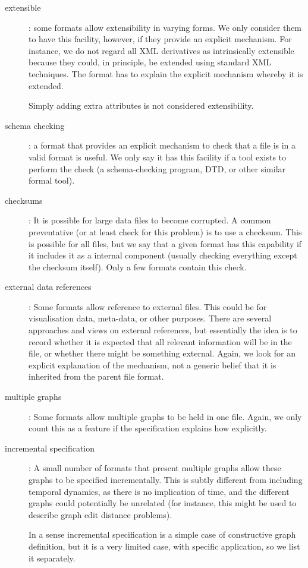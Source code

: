 \documentclass{sig-alternate}
\begin{document}
\begin{description}
\item[extensible]: some formats allow extensibility in varying
  forms. We only consider them to have this facility, however, if they
  provide an explicit mechanism. For instance, we do not regard all XML
  derivatives as intrinsically extensible because they could, in
  principle, be extended using standard XML techniques. The format has
  to explain the explicit mechanism whereby it is extended.

  Simply adding extra attributes is not considered extensibility.

\item[schema checking]: a format that provides an explicit mechanism
  to check that a file is in a valid format is useful. We only say it
  has this facility if a tool exists to perform the check (a
  schema-checking program, DTD, or other similar formal tool).

\item[checksums]: It is possible for large data files to become
  corrupted. A common preventative (or at least check for this
  problem) is to use a checksum. This is possible for all files, but
  we say that a given format has this capability if it includes it as
  a internal component (usually checking everything except the
  checksum itself). Only a few formats contain this check.

\item[external data references]: Some formats allow reference to
  external files. This could be for visualisation data, meta-data, or
  other purposes. There are several approaches and views on external
  references, but essentially the idea is to record whether it is
  expected that all relevant information will be in the file, or
  whether there might be something external.  Again, we look for an
  explicit explanation of the mechanism, not a generic belief that it
  is inherited from the parent file format.

\item[multiple graphs]: Some formats allow multiple graphs to be held
  in one file. Again, we only count this as a feature if the
  specification explains how explicitly.

\item[incremental specification]: A small number of formats that
  present multiple graphs allow these graphs to be specified
  incrementally. This is subtly different from including temporal
  dynamics, as there is no implication of time, and the different
  graphs could potentially be unrelated (for instance, this might be
  used to describe graph edit distance problems).

  In a sense incremental specification is a simple case of
  constructive graph definition, but it is a very limited case, with
  specific application, so we list it separately.

\end{description}
\end{document}
